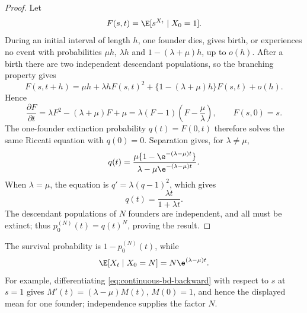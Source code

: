 \begin{proof}
Let
\begin{equation}
  F(s,t)=\E[s^{X_t}\mid X_0=1].
\end{equation}
During an initial interval of length \(h\), one founder dies, gives birth, or
experiences no event with probabilities \(\mu h\), \(\lambda h\) and
\(1-(\lambda+\mu)h\), up to \(o(h)\).  After a birth there are two independent
descendant populations, so the branching property gives
\begin{equation}
  F(s,t+h)
  =\mu h+\lambda hF(s,t)^2
   +\{1-(\lambda+\mu)h\}F(s,t)+o(h).
\end{equation}
Hence
\begin{equation}
  \frac{\partial F}{\partial t}
  =\lambda F^2-(\lambda+\mu)F+\mu
  =\lambda(F-1)\left(F-\frac{\mu}{\lambda}\right),
  \qquad F(s,0)=s.
  \label{eq:continuous-bd-backward}
\end{equation}
The one-founder extinction probability \(q(t)=F(0,t)\) therefore solves the same
Riccati equation with \(q(0)=0\).  Separation gives, for
\(\lambda\neq\mu\),
\begin{equation}
  q(t)
  =\frac{\mu\{1-\e^{-(\lambda-\mu)t}\}}
         {\lambda-\mu\e^{-(\lambda-\mu)t}}.
\end{equation}
When \(\lambda=\mu\), the equation is
\(q'=\lambda(q-1)^2\), which gives
\begin{equation}
  q(t)=\frac{\lambda t}{1+\lambda t}.
\end{equation}
The descendant populations of \(N\) founders are independent, and all must be
extinct; thus \(p_0^{(N)}(t)=q(t)^N\), proving the result.
\end{proof}

The survival probability is \(1-p_0^{(N)}(t)\), while
\begin{equation}
  \E[X_t\mid X_0=N]=N\e^{(\lambda-\mu)t}.
  \label{eq:continuous-bd-mean}
\end{equation}
For example, differentiating \cref{eq:continuous-bd-backward} with respect to
\(s\) at \(s=1\) gives
\(M'(t)=(\lambda-\mu)M(t)\), \(M(0)=1\), and hence the displayed mean for one
founder; independence supplies the factor \(N\).

